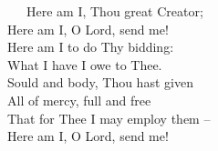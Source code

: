 \documentclass[
]{book}
\begin{document}
~~~Here am I, Thou great Creator;\\
\hspace*{0.333em}\hspace*{0.333em}\hspace*{0.333em}Here am I, O Lord, send me!\\
\hspace*{0.333em}\hspace*{0.333em}\hspace*{0.333em}Here am I to do Thy bidding:\\
\hspace*{0.333em}\hspace*{0.333em}\hspace*{0.333em}What I have I owe to Thee.\\
\hspace*{0.333em}\hspace*{0.333em}\hspace*{0.333em}Sould and body, Thou hast given\\
\hspace*{0.333em}\hspace*{0.333em}\hspace*{0.333em}All of mercy, full and free\\
\hspace*{0.333em}\hspace*{0.333em}\hspace*{0.333em}That for Thee I may employ them --\\
\hspace*{0.333em}\hspace*{0.333em}\hspace*{0.333em}Here am I, O Lord, send me!
\end{document}
